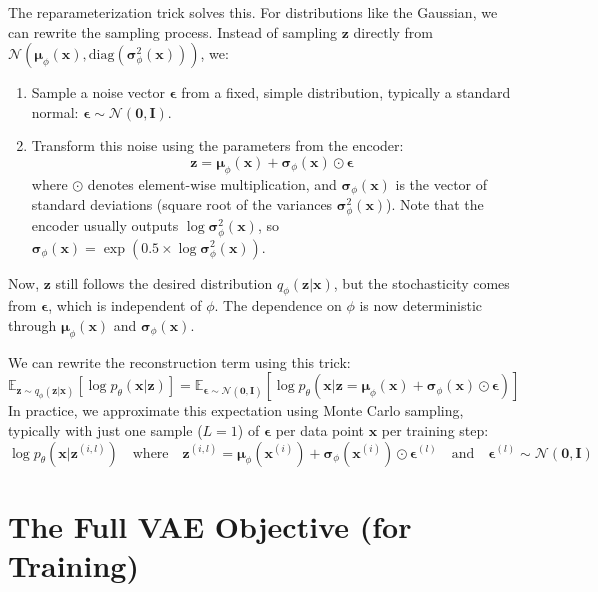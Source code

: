\documentclass[11pt, letterpaper]{article}
\newcommand{\vx}{\boldsymbol{x}} %
\newcommand{\vz}{\boldsymbol{z}} %
\newcommand{\vepsilon}{\boldsymbol{\epsilon}} %
\newcommand{\vmu}{\boldsymbol{\mu}} %
\newcommand{\vsigma}{\boldsymbol{\sigma}} %
\newcommand{\mI}{\boldsymbol{I}} %
\newcommand{\E}{\mathbb{E}} %
\newcommand{\Ndist}{\mathcal{N}} %
\begin{document}
The reparameterization trick solves this. For distributions like the Gaussian, we can rewrite the sampling process. Instead of sampling $\vz$ directly from $\Ndist(\vmu_{\phi}(\vx), \text{diag}(\vsigma^2_{\phi}(\vx)))$, we:
\begin{enumerate}
    \item Sample a noise vector $\vepsilon$ from a fixed, simple distribution, typically a standard normal: $\vepsilon \sim \Ndist(\mathbf{0}, \mI)$.
    \item Transform this noise using the parameters from the encoder:
    \begin{equation}
        \vz = \vmu_{\phi}(\vx) + \vsigma_{\phi}(\vx) \odot \vepsilon
        \label{eq:reparam}
    \end{equation}
    where $\odot$ denotes element-wise multiplication, and $\vsigma_{\phi}(\vx)$ is the vector of standard deviations (square root of the variances $\vsigma^2_{\phi}(\vx)$). Note that the encoder usually outputs $\log \vsigma^2_{\phi}(\vx)$, so $\vsigma_{\phi}(\vx) = \exp(0.5 \times \log \vsigma^2_{\phi}(\vx))$.
\end{enumerate}
Now, $\vz$ still follows the desired distribution $q_{\phi}(\vz|\vx)$, but the stochasticity comes from $\vepsilon$, which is independent of $\phi$. The dependence on $\phi$ is now deterministic through $\vmu_{\phi}(\vx)$ and $\vsigma_{\phi}(\vx)$.

We can rewrite the reconstruction term using this trick:
\begin{equation}
    \E_{\vz \sim q_{\phi}(\vz|\vx)} \left[ \log p_{\theta}(\vx|\vz) \right] = \E_{\vepsilon \sim \Ndist(\mathbf{0}, \mI)} \left[ \log p_{\theta}(\vx|\vz = \vmu_{\phi}(\vx) + \vsigma_{\phi}(\vx) \odot \vepsilon) \right]
\end{equation}
In practice, we approximate this expectation using Monte Carlo sampling, typically with just one sample ($L=1$) of $\vepsilon$ per data point $\vx$ per training step:
\begin{equation}
    \log p_{\theta}(\vx|\vz^{(i, l)}) \quad \text{where} \quad \vz^{(i, l)} = \vmu_{\phi}(\vx^{(i)}) + \vsigma_{\phi}(\vx^{(i)}) \odot \vepsilon^{(l)} \quad \text{and} \quad \vepsilon^{(l)} \sim \Ndist(\mathbf{0}, \mI)
\end{equation}

\section{The Full VAE Objective (for Training)}
\end{document}
